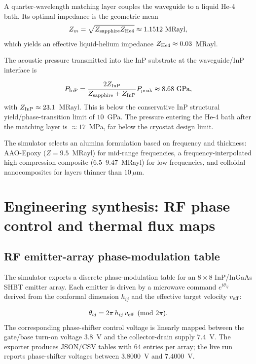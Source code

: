 \documentclass[aps,pra,10pt,onecolumn,superscriptaddress,nofootinbib,longbibliography,floatfix]{revtex4-2}
\newcommand{\ExoticPhaseTableVOn}{3.8}%
\newcommand{\ExoticPhaseTableVcc}{7.4}%
\newcommand{\ExoticPhaseTableEntries}{64}%
\newcommand{\ExoticPhaseTableMinVPhase}{3.8000}%
\newcommand{\ExoticPhaseTableMaxVPhase}{7.4000}%
\begin{document}
A quarter-wavelength matching layer couples the waveguide to a liquid He-4 bath.  Its optimal impedance is the geometric mean
%
\begin{equation}
Z_m = \sqrt{Z_{\rm sapphire} Z_{\rm He4}} \approx 1.1512\ \mathrm{MRayl},
\end{equation}
%
which yields an effective liquid-helium impedance $Z_{\rm He4} \approx 0.03$~MRayl.

\begin{sloppypar}
The acoustic pressure transmitted into the InP substrate at the waveguide/InP interface is
\end{sloppypar}
%
\begin{equation}
P_{\rm InP} = \frac{2 Z_{\rm InP}}{Z_{\rm sapphire} + Z_{\rm InP}} P_{\rm peak}
\approx 8.68\ \mathrm{GPa},
\end{equation}
%
with $Z_{\rm InP} \approx 23.1$~MRayl.  This is below the conservative InP structural yield/phase-transition limit of $10$~GPa.  The pressure entering the He-4 bath after the matching layer is $\approx 17$~MPa, far below the cryostat design limit.

\begin{sloppypar}
The simulator selects an alumina formulation based on frequency and thickness: AAO-Epoxy ($Z=9.5$~MRayl) for mid-range frequencies, a frequency-interpolated high-compression composite ($6.5$--$9.47$~MRayl) for low frequencies, and colloidal nanocomposites for layers thinner than $10\,\mu$m.
\end{sloppypar}

\FloatBarrier
\clearpage
\section{Engineering synthesis: RF phase control and thermal flux maps}

\subsection{RF emitter-array phase-modulation table}

\begin{sloppypar}
The simulator exports a discrete phase-modulation table for an $8 \times 8$ InP/InGaAs SHBT emitter array.  Each emitter is driven by a microwave command $e^{i \theta_{ij}}$ derived from the conformal dimension $h_{ij}$ and the effective target velocity $v_{\rm eff}$:
\end{sloppypar}
%
\begin{equation}
\theta_{ij} = 2\pi \, h_{ij} \, v_{\rm eff} \pmod{2\pi} .
\end{equation}
%
The corresponding phase-shifter control voltage is linearly mapped between the gate/base turn-on voltage $\ExoticPhaseTableVOn{}$~V and the collector-drain supply $\ExoticPhaseTableVcc{}$~V.  The exporter produces JSON/CSV tables with $\ExoticPhaseTableEntries{}$ entries per array; the live run reports phase-shifter voltages between $\ExoticPhaseTableMinVPhase{}$~V and $\ExoticPhaseTableMaxVPhase{}$~V.
\end{document}
